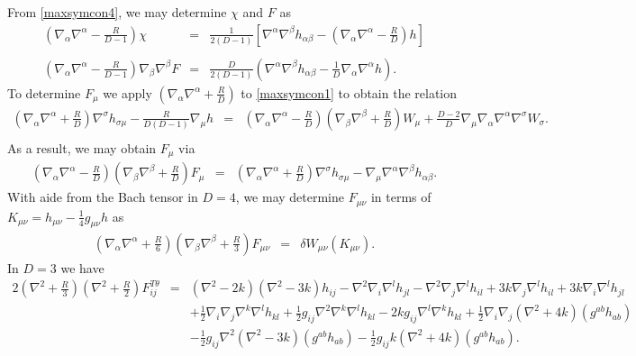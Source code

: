 \documentclass[10pt,letterpaper]{article}
\numberwithin{equation}{section}
\begin{document}
From \eqref{maxsymcon4}, we may determine $\chi$ and $F$ as
\begin{eqnarray}
\left( \nabla_\alpha\nabla^\alpha -\frac{R}{D-1}\right)\chi &=& \frac{1}{2(D-1)}\left[ \nabla^\alpha\nabla^\beta h_{\alpha\beta}  -\left(\nabla_\alpha\nabla^\alpha - \frac{R}{D}\right)h\right]
\\ \nonumber\\
\left(\nabla_\alpha\nabla^\alpha - \frac{R}{D-1}\right) \nabla_\beta\nabla^\beta F &=& \frac{D}{2(D-1)}\left( \nabla^\alpha\nabla^\beta h_{\alpha\beta}  - \frac{1}{D}\nabla_\alpha\nabla^\alpha h\right).
\end{eqnarray}
To determine $F_\mu$ we apply $(\nabla_\alpha\nabla^\alpha + \frac{R}{D})$ to \eqref{maxsymcon1} to obtain the relation
\begin{eqnarray}
\left(\nabla_\alpha\nabla^\alpha + \frac{R}{D}\right)\nabla^\sigma h_{\sigma\mu} - \frac{R}{D(D-1)}\nabla_\mu h
&=& \left(\nabla_\alpha\nabla^\alpha - \frac{R}{D}\right)\left(\nabla_\beta\nabla^\beta + \frac{R}{D}\right) W_\mu + \frac{D-2}{D}\nabla_\mu \nabla_\alpha\nabla^\alpha \nabla^\sigma W_\sigma.
\nonumber\\
\end{eqnarray}
As a result, we may obtain $F_{\mu}$ via
\begin{eqnarray}
\left(\nabla_\alpha\nabla^\alpha - \frac{R}{D}\right)\left(\nabla_\beta\nabla^\beta + \frac{R}{D}\right) F_\mu
&=& \left(\nabla_\alpha\nabla^\alpha+\frac{R}{D}\right)\nabla^\sigma h_{\sigma\mu} - \nabla_\mu \nabla^\alpha\nabla^\beta h_{\alpha\beta}.
\end{eqnarray}
With aide from the Bach tensor in $D=4$, we may determine $F_{\mu\nu}$ in terms of $K_{\mu\nu} = h_{\mu\nu} -\tfrac14 g_{\mu\nu}h$ as
\begin{eqnarray}
 \left(\nabla_\alpha\nabla^\alpha + \frac{R}{6}\right)\left(\nabla_\beta\nabla^\beta +\frac{R}{3}\right)F_{\mu\nu}&=& \delta W_{\mu\nu}(K_{\mu\nu}).
 \label{htt4}
\end{eqnarray}
In $D=3$ we have
\begin{eqnarray}
2\left(\nabla^2+\frac{R}{3}\right)\left(\nabla^2+\frac{R}{2}\right)F_{ij}^{T\theta}
&=&(\nabla^2-2k)(\nabla^2-3k)h_{ij}-\nabla^2 \nabla_i \nabla^l h_{jl} - \nabla^2 \nabla_j \nabla^l h_{il}+3k\nabla_j \nabla^l h_{il}+3k\nabla_i \nabla^l h_{jl}
\nonumber\\
&&+\tfrac12 \nabla_i\nabla_j \nabla^k \nabla^l h_{kl}+\tfrac12 g_{ij} \nabla^2 \nabla^k \nabla^l h_{kl}
-2k g_{ij} \nabla^l \nabla^k h_{kl}+ \tfrac12 \nabla_i \nabla_j (\nabla^2+4k)(g^{ab}h_{ab})
\nonumber\\
&& -\tfrac12 g_{ij}\nabla^2(\nabla^2-3k)(g^{ab}h_{ab})-\tfrac12 g_{ij} k (\nabla^2+4k)(g^{ab}h_{ab}).
\label{htt3}
\end{eqnarray}
\end{document}
